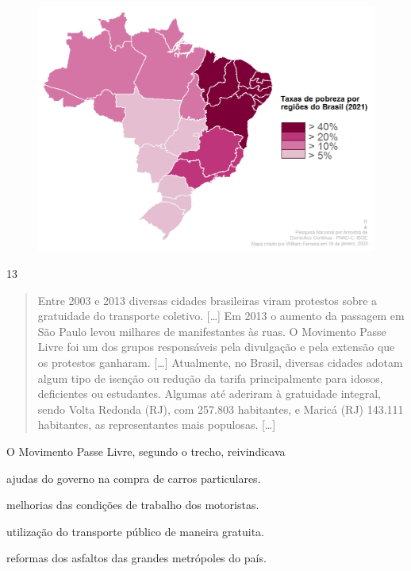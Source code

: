 \begin{figure}[htpb!]
\includegraphics[width=.5\textwidth]{./imgs/img67.png}
\end{figure}


\pagebreak
\num{13}

\begin{quote}
Entre 2003 e 2013 diversas cidades brasileiras viram protestos sobre a
gratuidade do transporte coletivo. {[}\ldots{}{]} Em 2013 o aumento da passagem em São
Paulo levou milhares de manifestantes às ruas. O Movimento Passe Livre
foi um dos grupos responsáveis pela divulgação e pela extensão que os
protestos ganharam. {[}\ldots{}{]} Atualmente, no Brasil, diversas cidades adotam algum
tipo de isenção ou redução da tarifa principalmente para idosos,
deficientes ou estudantes. Algumas até aderiram à gratuidade integral,
sendo Volta Redonda (RJ), com 257.803 habitantes, e Maricá (RJ) 143.111
habitantes, as representantes mais populosas. {[}\ldots{}{]}

\end{quote}

\noindent{}O Movimento Passe Livre, segundo o trecho, reivindicava

\begin{escolha}
\item ajudas do governo na compra de carros particulares.

\item melhorias das condições de trabalho dos motoristas.

\item utilização do transporte público de maneira gratuita.

\item reformas dos asfaltos das grandes metrópoles do país.
\end{escolha}

